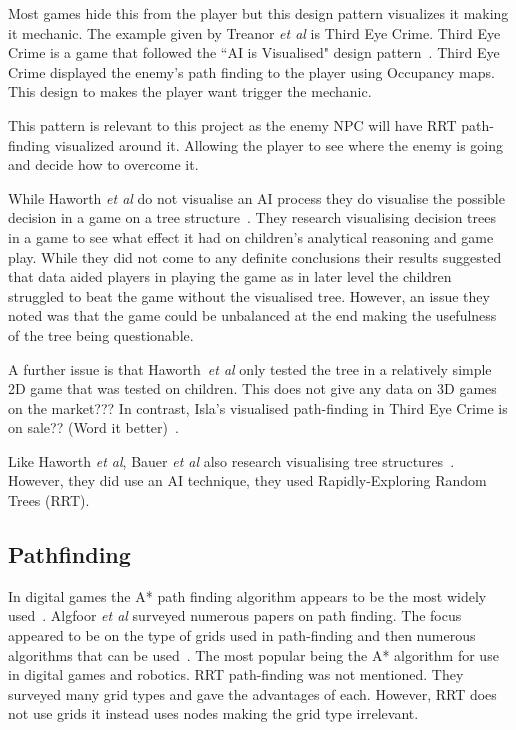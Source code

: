 \documentclass[journal]{IEEEtran}
\begin{document}
Most games hide this from the player but this design pattern visualizes it making it mechanic.  
The example given by Treanor \textit{et al} is Third Eye Crime.  Third Eye Crime is a game that followed the ``AI is Visualised" design pattern~\cite{Isla2014}.  Third Eye Crime displayed the enemy's path finding to the player using Occupancy maps.  
This design to makes the player want trigger the mechanic.  

This pattern is relevant to this project as the enemy NPC  will have  RRT path-finding visualized around it. Allowing the player to see where the enemy is going and decide how to overcome it.

While Haworth \textit{et al} do not visualise an AI process they do visualise the possible decision in a game on a tree structure~\cite{Haworth2010}. They research visualising decision trees in a game to see what effect it had on children's analytical reasoning and game play.  While they did not come to any definite conclusions their results suggested that data aided players in playing the game as in later level the children struggled to beat the game without the visualised tree. However, an issue they noted was that the game could be unbalanced at the end making the usefulness of the tree being questionable.  

A further issue is that Haworth~\textit{et al} only tested the tree in a relatively simple 2D game that was tested on children. This does not give any data on 3D games on the market??? In contrast, Isla's visualised path-finding in Third Eye Crime is on sale?? (Word it better)~\cite{Isla2014}.
 
Like  Haworth \textit{et al}, Bauer \textit{et al} also research visualising tree structures~\cite{bauer2012}. However, they did use an AI technique, they used Rapidly-Exploring Random Trees (RRT).

\subsection{Pathfinding}
In digital games the A* path finding algorithm appears to be the most widely used~\cite{Algfoor2015}.  Algfoor \textit{et al} surveyed numerous papers on path finding. The focus appeared to be on the type of grids used in path-finding and then numerous algorithms that can be used~\cite{Algfoor2015}. The most popular being the A* algorithm for use in digital games and robotics. RRT path-finding was not mentioned. 
They surveyed many grid types and gave the advantages of each. However, RRT does not use grids it instead uses nodes making the grid type irrelevant.\\
\end{document}
